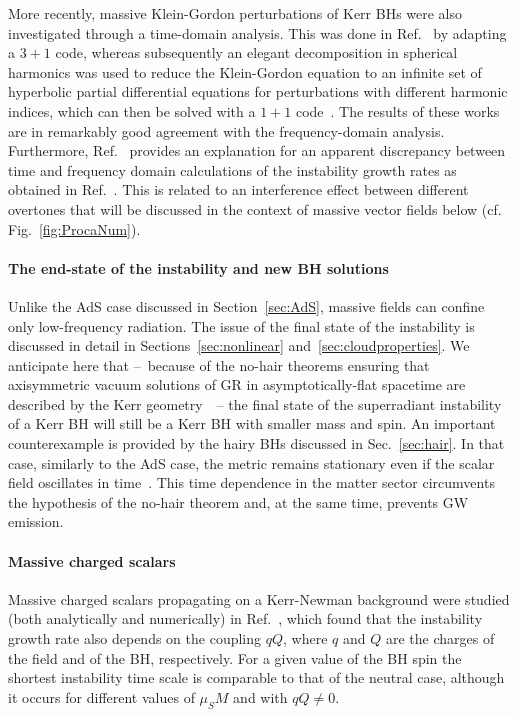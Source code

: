 \documentclass[11pt]{article}
\numberwithin{equation}{section} %
\begin{document}
More recently, massive Klein-Gordon perturbations of Kerr BHs were also investigated through a time-domain analysis. This was done in Ref.~\cite{Witek:2012tr} by adapting a $3+1$ code, whereas subsequently an elegant decomposition in spherical harmonics was used to reduce the Klein-Gordon equation to an infinite set of hyperbolic partial differential equations for perturbations with different harmonic indices, which can then be solved with a $1+1$ code~\cite{Dolan:2012yt}. The results of these works are in remarkably good agreement with the frequency-domain analysis. Furthermore, Ref.~\cite{Witek:2012tr} provides an explanation for an apparent discrepancy between
time and frequency domain calculations of the instability growth rates as obtained in Ref.~\cite{Strafuss:2004qc}. This 
is related to an interference effect between different overtones that will be discussed in the context of massive vector 
fields below (cf. Fig.~\ref{fig:ProcaNum}).


\paragraph{The end-state of the instability and new BH solutions}
Unlike the AdS case discussed in Section~\ref{sec:AdS}, massive fields can confine only low-frequency radiation. The issue of the final state of the instability is discussed in detail in Sections~\ref{sec:nonlinear} and~\ref{sec:cloudproperties}. We anticipate here that --~because of the no-hair theorems ensuring that axisymmetric vacuum solutions of GR in asymptotically-flat spacetime are described by the Kerr geometry~\cite{HawkingBook,Heusler:1995qj,Sotiriou:2011dz,Graham:2014ina}~-- the final state of the superradiant instability of a Kerr BH will still be a Kerr BH with smaller mass and spin. An important counterexample is provided by the hairy BHs discussed in Sec.~\ref{sec:hair}. In that case, similarly to the AdS case, the metric remains stationary even if the scalar field oscillates in time~\cite{Herdeiro:2014goa,Herdeiro:2017phl}. This time dependence in the matter sector circumvents the hypothesis of the no-hair theorem and, at the same time, prevents GW emission.



\paragraph{Massive charged scalars}
Massive charged scalars propagating on a Kerr-Newman background were studied (both analytically and numerically) in Ref.~\cite{Furuhashi:2004jk}, which found that the instability growth rate also depends on the coupling $qQ$, where $q$ and $Q$ are the charges of the field and of the BH, respectively. For a given value of the BH spin the shortest instability time scale is comparable to that of the neutral case, although it occurs for different values of $\mu_S M$ and with $qQ\neq0$.
\end{document}
